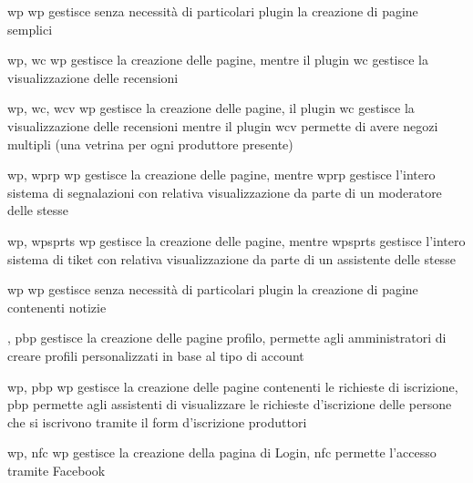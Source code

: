 {\acrlong{wp}}
{\acrlong{wp} gestisce senza necessità di particolari plugin la creazione di pagine semplici}


{\acrlong{wp}, \acrlong{wc}}
{\acrlong{wp} gestisce la creazione delle pagine, mentre il plugin \acrlong{wc} gestisce la visualizzazione delle recensioni}


{\acrlong{wp}, \acrlong{wc}, \acrlong{wcv}}
{\acrlong{wp} gestisce la creazione delle pagine, il plugin \acrlong{wc} gestisce la visualizzazione delle recensioni mentre il plugin \acrlong{wcv} permette di avere negozi multipli (una vetrina per ogni produttore presente)}


{\acrlong{wp}, \acrlong{wprp}}
{\acrlong{wp} gestisce la creazione delle pagine, mentre \acrlong{wprp} gestisce l'intero sistema di segnalazioni con relativa visualizzazione da parte di un moderatore delle stesse}


{\acrlong{wp}, \acrlong{wpsprts}}
{\acrlong{wp} gestisce la creazione delle pagine, mentre \acrlong{wpsprts} gestisce l'intero sistema di tiket con relativa visualizzazione da parte di un assistente delle stesse}


{\acrlong{wp}}
{\acrlong{wp} gestisce senza necessità di particolari plugin la creazione di pagine contenenti notizie}


{, \acrlong{pbp}}
{ gestisce la creazione delle pagine profilo,  permette agli amministratori di creare profili personalizzati in base al tipo di account}


{\acrlong{wp}, \acrlong{pbp}}
{\acrlong{wp} gestisce la creazione delle pagine contenenti le richieste di iscrizione, \acrlong{pbp} permette agli assistenti di visualizzare le richieste d'iscrizione delle persone che si iscrivono tramite il form d'iscrizione produttori}


{\acrlong{wp}, \acrlong{nfc}}
{\acrlong{wp} gestisce la creazione della pagina di Login, \acrlong{nfc} permette l'accesso tramite Facebook}

